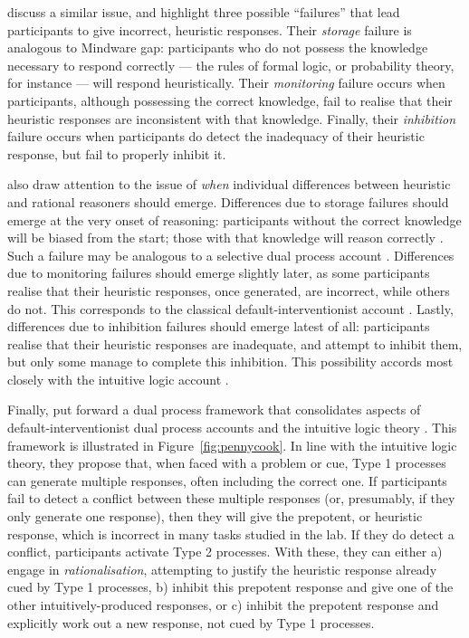 \citet{DeNeys2013} discuss a similar issue, and highlight
three possible ``failures'' that lead participants to give incorrect, heuristic responses.
Their \emph{storage} failure is analogous to  Mindware gap:
participants who do not possess the knowledge necessary to respond correctly
--- the rules of formal logic, or probability theory, for instance ---
will respond heuristically.
Their \emph{monitoring} failure occurs when participants,
although possessing the correct knowledge,
fail to realise that their heuristic responses are inconsistent with that knowledge.
Finally, their \emph{inhibition} failure occurs when
participants do detect the inadequacy of their heuristic response,
but fail to properly inhibit it.

\citet{DeNeys2013} also draw attention to the issue of
\emph{when} individual differences between
heuristic and rational reasoners should emerge.
Differences due to storage failures should emerge
at the very onset of reasoning:
participants without the correct knowledge will be biased from the start;
those with that knowledge will reason correctly .
Such a failure may be analogous to a selective dual process account
\citep{Klaczynski2004}.
Differences due to monitoring failures should emerge slightly later,
as some participants realise that their heuristic responses,
once generated, are incorrect, while others do not.
This corresponds to the classical default-interventionist account \citep{Evans2006}.
Lastly, differences due to inhibition failures
should emerge latest of all:
participants realise that their heuristic responses are inadequate,
and attempt to inhibit them, but only some manage to complete this inhibition.
This possibility accords most closely with the intuitive logic account \citep{DeNeys2012}.



Finally, \citet{Pennycook2015} put forward a dual process framework
that consolidates aspects of default-interventionist dual process accounts \citep[e.g.][]{Evans2006}
and the intuitive logic theory \citep{DeNeys2012}.
This framework is illustrated in Figure~\ref{fig:pennycook}.
In line with the intuitive logic theory,
they propose that, when faced with a problem or cue,
Type 1 processes can generate multiple responses,
often including the correct one.
If participants fail to detect a conflict between these multiple responses
(or, presumably, if they only generate one response),
then they will give the prepotent, or heuristic response,
which is incorrect in many tasks studied in the lab.
If they do detect a conflict, participants activate Type 2 processes.
With these, they can either a) engage in \emph{rationalisation},
attempting to justify the heuristic response already cued by Type 1 processes,
b) inhibit this prepotent response and give one
of the other intuitively-produced responses, or
c) inhibit the prepotent response and explicitly work out a new response,
not cued by Type 1 processes.

